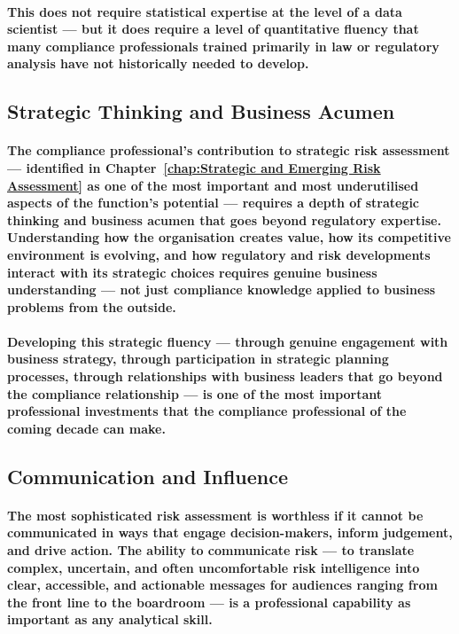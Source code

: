 \paragraph{This does not require statistical expertise at the level of a data scientist — but it does require a level of quantitative fluency that many compliance professionals trained primarily in law or regulatory analysis have not historically needed to develop.}

\subsection{Strategic Thinking and Business Acumen}
\paragraph{The compliance professional's contribution to strategic risk assessment — identified in Chapter~\ref{chap:Strategic and Emerging Risk Assessment} as one of the most important and most underutilised aspects of the function's potential — requires a depth of strategic thinking and business acumen that goes beyond regulatory expertise. Understanding how the organisation creates value, how its competitive environment is evolving, and how regulatory and risk developments interact with its strategic choices requires genuine business understanding — not just compliance knowledge applied to business problems from the outside.}
\paragraph{Developing this strategic fluency — through genuine engagement with business strategy, through participation in strategic planning processes, through relationships with business leaders that go beyond the compliance relationship — is one of the most important professional investments that the compliance professional of the coming decade can make.}

\subsection{Communication and Influence}
\paragraph{The most sophisticated risk assessment is worthless if it cannot be communicated in ways that engage decision-makers, inform judgement, and drive action. The ability to communicate risk — to translate complex, uncertain, and often uncomfortable risk intelligence into clear, accessible, and actionable messages for audiences ranging from the front line to the boardroom — is a professional capability as important as any analytical skill.}
